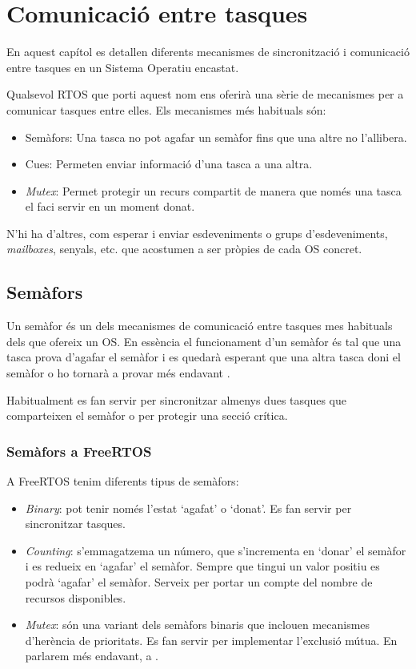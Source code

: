 
\chapter{Comunicació entre tasques}

En aquest capítol es detallen diferents mecanismes de sincronització i comunicació entre tasques en un Sistema Operatiu encastat.

Qualsevol RTOS que porti aquest nom ens oferirà una sèrie de mecanismes per a comunicar tasques entre elles. Els mecanismes més habituals són:
\begin{itemize}
 \item Semàfors: Una tasca no pot agafar un semàfor fins que una altre no l'allibera.
 \item Cues: Permeten enviar informació d'una tasca a una altra.
 \item {\em Mutex}: Permet protegir un recurs compartit de manera que només una tasca el faci servir en un moment donat.
\end{itemize}

N'hi ha d'altres, com esperar i enviar esdeveniments o grups d'esdeveniments, {\em mailboxes}, senyals, etc. que acostumen a ser pròpies de cada \gls{OS} concret.

\section{Semàfors}
Un semàfor és un dels mecanismes de comunicació entre tasques mes habituals dels que ofereix un OS. En essència el funcionament d'un semàfor és tal que una tasca prova d'agafar el semàfor i es quedarà esperant que una altra tasca doni el semàfor o ho tornarà a provar més endavant \cite[244]{EmbeddedDictionary} \cite[187]{programmingembedded}.

Habitualment es fan servir per sincronitzar almenys dues tasques que comparteixen el semàfor o per protegir una secció crítica.

\subsection{Semàfors a FreeRTOS}
\label{sub:semaphores}

A FreeRTOS tenim diferents tipus de semàfors:

\begin{itemize}
 \item {\em Binary}: pot tenir només l'estat ‘agafat' o ‘donat'. Es fan servir per sincronitzar tasques.
 \item {\em Counting}: s'emmagatzema un número, que s'incrementa en ‘donar' el semàfor i es redueix en ‘agafar' el semàfor. Sempre que tingui un valor positiu es podrà ‘agafar' el semàfor. Serveix per portar un compte del nombre de recursos disponibles.
 \item {\em Mutex}: són una variant dels semàfors binaris que inclouen mecanismes d'herència de prioritats. Es fan servir per implementar l'exclusió mútua. En parlarem més endavant, a .
\end{itemize}


